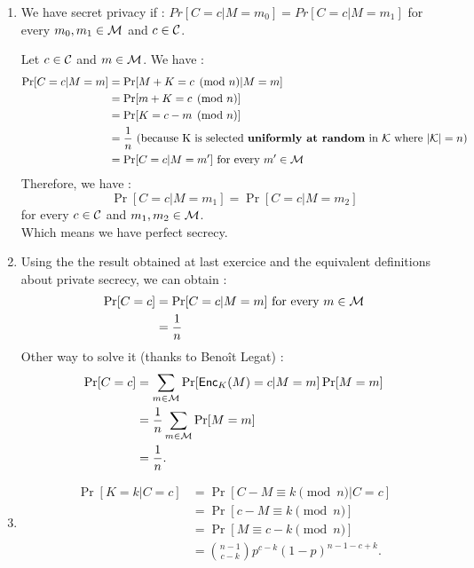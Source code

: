 \begin{solution}
  \begin{enumerate}
    \item
      We have secret privacy if : $Pr[C = c | M = m_0] = Pr[C = c | M = m_1] $ for every $m_0, m_1 \in \mathcal{M}$ and $c \in \mathcal{C}$.
      
      Let $c \in \mathcal{C}$ and $m\in \mathcal{M}$.
      We have :
      \begin{align*}
        \Pr[C = c | M = m]
        & = \Pr[M + K = c \pmod{n} | M = m]\\
        & = \Pr[m + K = c \pmod{n}]\\
        & = \Pr[K = c - m \pmod{n}]\\
        & = \frac{1}{n} \text{ (because K is selected \textbf{uniformly at random} in } \mathcal{K} \text{ where } |\mathcal{K}| = n )\\
        & = \Pr[C = c | M = m'] \text{ for every } m' \in \mathcal{M}
      \end{align*}
      Therefore, we have :
      \[
        \Pr[C = c | M = m_1] = \Pr[C = c | M = m_2]
      \]
      for every $c \in \mathcal{C}$ and $m_1,m_2 \in \mathcal{M}$. \\
      Which means we have perfect secrecy.
    \item
        Using the the result obtained at last exercice and the equivalent definitions about private secrecy, we can obtain :
      \begin{align*}
          \Pr[C = c]  & = \Pr[C = c | M = m] \text{ for every } m \in \mathcal{M} \\
          & = \frac{1}{n}
      \end{align*}
      Other way to solve it (thanks to Benoît Legat) : 
      \begin{align*}
        \Pr[C = c]
        & = \sum_{m \in \mathcal{M}} \Pr[\operatorname{\mathsf{Enc}}_K(M) = c | M = m] \Pr[M = m]\\
        & = \frac{1}{n} \sum_{m \in \mathcal{M}} \Pr[M = m]\\
        & = \frac{1}{n}.
      \end{align*}
    \item
      \begin{align*}
        \Pr[K = k | C = c]
        & = \Pr[C - M \equiv k \pmod{n} | C = c]\\
        & = \Pr[c - M \equiv k \pmod{n}]\\
        & = \Pr[M \equiv c - k \pmod{n}]\\
        & = {n-1 \choose c-k} p^{c-k} (1-p)^{n-1-c+k}.
      \end{align*}
  \end{enumerate}
\end{solution}


